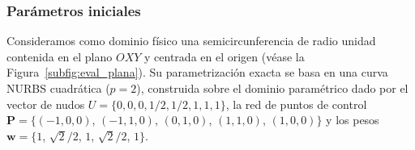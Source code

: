 \documentclass[11pt]{book}
\theoremstyle{plain} %
\theoremstyle{definition} %
\theoremstyle{definition} %
\begin{document}
\subsubsection{Parámetros iniciales}
    \vspace{-0.2cm}

Consideramos como dominio físico una semicircunferencia de radio unidad contenida en el plano $OXY$ y centrada en el origen (véase la Figura~\ref{subfig:eval_plana}). Su parametrización exacta se basa en una curva NURBS cuadrática ($p=2$), construida sobre el dominio paramétrico dado por el vector de nudos $U = \{0, 0, 0, 1/2, 1/2, 1, 1, 1\}$, la red de puntos de control $\mathbf{P} = \{ (-1,0,0)$, $(-1,1,0)$, $(0,1,0)$, $(1,1,0)$, $(1,0,0) \}$ y los pesos $\mathbf{w} = \{ 1$, $\sqrt{2}/2$, $1$, $\sqrt{2}/2$, $1 \}$.
\end{document}
